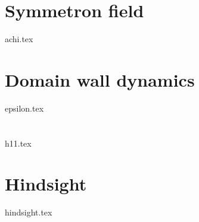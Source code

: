 
\section{Symmetron field}\label{sec:results:achi}
    {{achi.tex}}


\section{Domain wall dynamics}\label{sec:results:epsilon}
    {{epsilon.tex}}

\section{}\label{sec:results:h11}
    {{h11.tex}}


\section{Hindsight}\label{sec:results:hindsight}
    {{hindsight.tex}}



